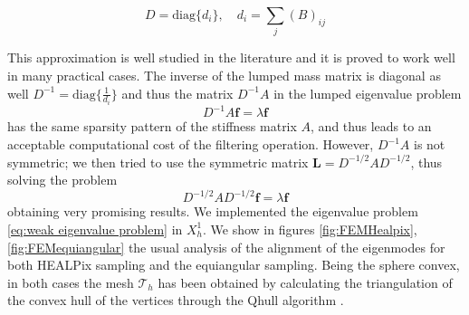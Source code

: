 \begin{equation}\label{eq:lumping}
D = \text{diag}\{d_i\},\quad d_i = \sum_j (B)_{ij}
\end{equation}

This approximation is well studied in the literature and it is proved to work well in many practical cases. The inverse of the lumped mass matrix is diagonal as well $D^{-1} = \text{diag}\{\frac{1}{d_i}\}$ and thus the matrix $D^{-1}A$ in the lumped eigenvalue problem 
\begin{equation}\label{eq:lumped eigenvalue problem}
	D^{-1}A\mathbf f = \lambda \mathbf f
\end{equation}
has the same sparsity pattern of the stiffness matrix $A$, and thus leads to an acceptable computational cost of the filtering operation. However, $D^{-1}A$ is not symmetric; we then tried to use the symmetric matrix $\mathbf L = D^{-1/2}AD^{-1/2}$, thus solving the problem 
\begin{equation}\label{eq:symmetric lumped eigenvalue problem}
D^{-1/2}AD^{-1/2}\mathbf f = \lambda \mathbf f
\end{equation}
obtaining very promising results.
We implemented the eigenvalue problem \ref{eq:weak eigenvalue problem} in $X_h^1$. We show in figures \ref{fig:FEMHealpix}, \ref{fig:FEMequiangular} the usual analysis of the alignment of the eigenmodes for both HEALPix sampling and the equiangular sampling. Being the sphere convex, in both cases the mesh $\mathcal T_h$ has been obtained by calculating the triangulation of the convex hull of the vertices through the Qhull algorithm \cite{Barber96thequickhull}.

